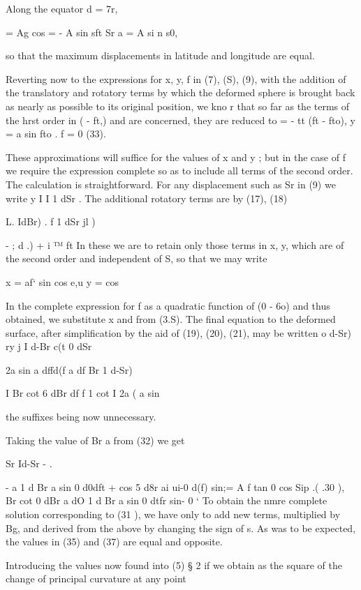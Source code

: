 Along the equator d = 7r,

= Ag cos = - A sin sft Sr a = A si n s0,

so that the maximum displacements in latitude and longitude are equal.

Reverting now to the expressions for x, y, f in (7), (S), (9), with the
addition of the translatory and rotatory terms by which the deformed sphere is
brought back as nearly as possible to its original position, we kno r that so
far as the terms of the hrst order in ( - ft,) and  are concerned, they are
reduced to = - tt (ft - fto), y = a sin fto . f = 0 (33).

These approximations will suffice for the values of x and y ; but in the case
of f we require the expression complete so as to include all terms of the
second order. The calculation is straightforward. For any displacement such as
Sr in (9) we write y I I  1 dSr .  The additional rotatory terms are by (17),
(18)

L. IdBr) . f 1 dSr jl )

 - ; d .) + i ™ ft In these we are to retain only those terms in x, y,
which are of the second order and independent of S, so that we may write

x = af‘ sin cos e,u y = cos

In the complete expression for f as a quadratic function of (0 - 6o) and  thus
obtained, we substitute x and  from (3.S).  The final equation to the deformed
surface, after simplification by the aid of (19), (20), (21), may be written o
d-Sr)  ry j  I d-Br c(t 0 dSr

 2a sin a dffd(f  a df Br 1 d-Sr)

I Br cot 6 dBr df f 1   cot I 2a ( a sin

the suffixes being now unnecessary.

Taking the value of Br a from (32) we get

Sr Id-Sr - .

  - a 1 d Br a sin 0 d0dft + cos 5 d8r ai ui-0 d(f)  sin;= A f tan  0 cos Sip
    .( .30 ), Br cot 0 dBr a dO 1 d Br a sin 0 dtfr sin- 0   ‘ To obtain the
nmre complete solution corresponding to (31 ), we have only to add new terms,
multiplied by Bg, and derived from the above by changing the sign of s. As was
to be expected, the values in (35) and (37) are equal and opposite.

Introducing the values now found into (5) § 2 if we obtain as the square of
the change of principal curvature at any point

